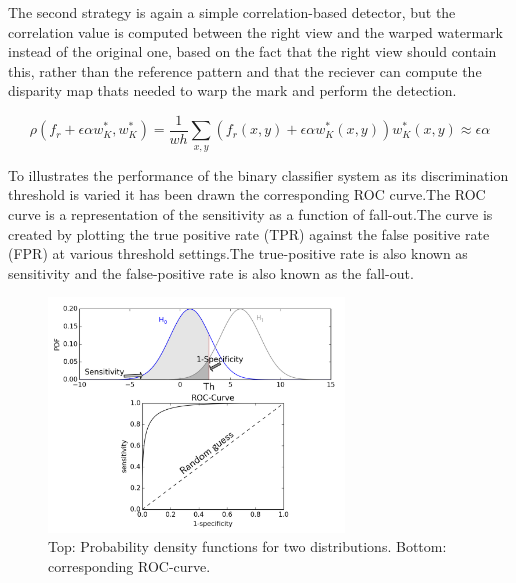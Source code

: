 The second strategy is again a simple correlation-based detector, but the correlation value is computed between the right view and the warped watermark instead of the original one, based on the fact that the right view should contain this, rather than the reference pattern and that the reciever can compute the disparity map thats needed to warp the mark and perform the detection.

$$\rho(f_{r}+\epsilon\alpha w_{K}^{*},w_{K}^{*})= \frac{1}{wh}\sum_{x,y}(f_{r}(x,y)+\epsilon\alpha w_{K}^{*}(x,y))w_{K}^{*}(x,y)\approx\epsilon\alpha $$

To illustrates the performance of the binary classifier system as its discrimination threshold is varied it has been drawn the corresponding ROC curve.\newline  The ROC curve is a representation of the sensitivity as a function of fall-out.\newline  The curve is created by plotting the true positive rate (TPR) against the false positive rate (FPR) at various threshold settings.\newline The true-positive rate is also known as sensitivity and the false-positive rate is also known as the fall-out.\newline  

\begin{figure}[h!]
\centering
\includegraphics[width=0.7\textwidth]{./img/roc.png}
\caption{\small{Top: Probability density functions for two distributions. Bottom: corresponding ROC-curve.}}
\label{fig:roc}
\end{figure}

